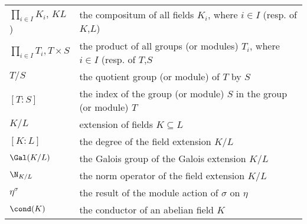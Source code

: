 \begin{flushleft}
\begin{longtable}[l]{ll}
  $\prod_{i\in I}K_i$, $KL$)                 & the compositum of all fields $K_i$, where $i\in I$ (resp. of $K$,$L$)\\[1mm]
  $\prod_{i\in I}T_i, T\times S$                 & the product of all groups (or modules) $T_i$, where $i\in I$ (resp. of $T$,$S$\\[1mm]
  $T/S$                 & the quotient group (or module) of $T$ by $S$ \\[1mm]
  $[T:S]$				    & the index of the group (or module) $S$ in the group (or module) $T$ \\[1mm]
  $K/L$					& extension of fields $K\subseteq L$ \\[1mm]
  $[K:L]$				& the degree of the field extension $K/L$ \\[1mm]
  $\Gal(K/L)$         & the Galois group of the Galois extension $K/L$ \\[1mm]
  $\N_{K/L}$         & the norm operator of the field extension $K/L$ \\[1mm]
  $\eta^{\sigma}$ & the result of the module action of $\sigma$ on $\eta$ \\[1mm]
  $\cond(K)$			& the conductor of an abelian field $K$ \\[1mm]
\end{longtable}
\end{flushleft}
